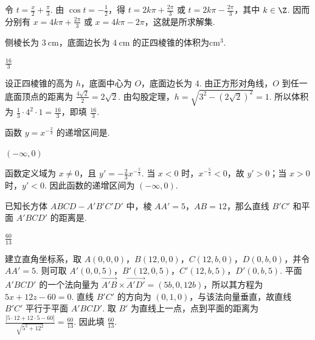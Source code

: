 \begin{solution}
令 \(t=\frac{x}{2}+\frac{\pi}{3}\). 由 \(\cos t=-\frac{1}{2}\)，得 \(t=2k\pi+\frac{2\pi}{3}\) 或 \(t=2k\pi-\frac{2\pi}{3}\)，其中 \(k\in\Z\). 因而分别有 \(x=4k\pi+\frac{2\pi}{3}\) 或 \(x=4k\pi-2\pi\)，这就是所求解集.
\end{solution}

\begin{problem}
侧棱长为 \(3 \mathrm{~cm}\)，底面边长为 \(4 \mathrm{~cm}\) 的正四棱锥的体积为\fillinblank{}\(\mathrm{cm}^3\).
\end{problem}

\begin{answer}
\(\frac{16}{3}\)
\end{answer}

\begin{solution}
设正四棱锥的高为 \(h\)，底面中心为 \(O\)，底面边长为 \(4\). 由正方形对角线，\(O\) 到任一底面顶点的距离为 \(\frac{4\sqrt{2}}{2}=2\sqrt{2}\). 由勾股定理，\(h=\sqrt{3^2-(2\sqrt{2})^2}=1\). 所以体积为 \(\frac{1}{3}\cdot4^2\cdot1=\frac{16}{3}\)，即填 \(\frac{16}{3}\).
\end{solution}

\begin{problem}
函数 \(y=x^{-\frac{2}{3}}\) 的递增区间是\fillinblank{}.
\end{problem}

\begin{answer}
\((-\infty,0)\)
\end{answer}

\begin{solution}
函数定义域为 \(x\neq0\)，且 \(y'=-\frac{2}{3}x^{-\frac{5}{3}}\). 当 \(x<0\) 时，\(x^{-\frac{5}{3}}<0\)，故 \(y'>0\)；当 \(x>0\) 时，\(y'<0\). 因此函数的递增区间为 \((-\infty,0)\).
\end{solution}

\begin{problem}
已知长方体 \(ABCD-A'B'C'D'\) 中，棱 \(AA'=5\)，\(AB=12\)，那么直线 \(B'C'\) 和平面 \(A'BCD'\) 的距离是\fillinblank{}.

\end{problem}

\begin{answer}
\(\frac{60}{13}\)
\end{answer}

\begin{solution}
建立直角坐标系，取 \(A(0,0,0)\)，\(B(12,0,0)\)，\(C(12,b,0)\)，\(D(0,b,0)\)，并令 \(AA'=5\). 则可取 \(A'(0,0,5)\)，\(B'(12,0,5)\)，\(C'(12,b,5)\)，\(D'(0,b,5)\). 平面 \(A'BCD'\) 的一个法向量为 \(\overrightarrow{A'B}\times\overrightarrow{A'D'}=(5b,0,12b)\)，所以其方程为 \(5x+12z-60=0\). 直线 \(B'C'\) 的方向为 \((0,1,0)\)，与该法向量垂直，故直线 \(B'C'\) 平行于平面 \(A'BCD'\). 取 \(B'\) 为直线上一点，点到平面的距离为 \(\frac{|5\cdot12+12\cdot5-60|}{\sqrt{5^2+12^2}}=\frac{60}{13}\). 因此填 \(\frac{60}{13}\).
\end{solution}

